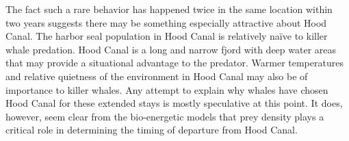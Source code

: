 The fact such a rare behavior has happened twice in the same location
within two years suggests there may be something especially attractive
about Hood Canal. The harbor seal population in Hood Canal is relatively
naïve to killer whale predation. Hood Canal is a long and narrow fjord
with deep water areas that may provide a situational advantage to the
predator. Warmer temperatures and relative quietness of the environment
in Hood Canal may also be of importance to killer whales. Any attempt to
explain why whales have chosen Hood Canal for these extended stays is
mostly speculative at this point. It does, however, seem clear from the
bio-energetic models that prey density plays a critical role in
determining the timing of departure from Hood Canal.
